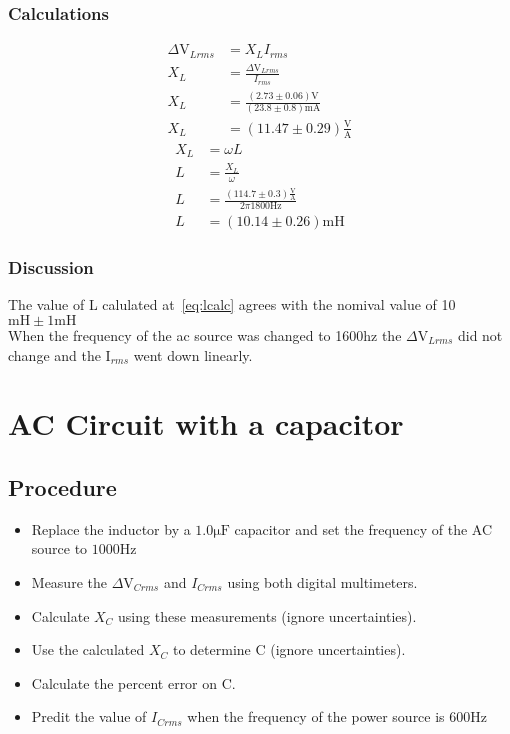 \documentclass{report}
\begin{document}
\subsection{Calculations}
\begin{align}
    \Delta\si{\volt}_{Lrms}&=X_{L}I_{rms}\nonumber\\
    X_{L}&=\frac{\Delta\si{\volt}_{Lrms}}{I_{rms}}\nonumber\\
    X_{L}&=\frac{(2.73\pm0.06)\si{\volt}}{(23.8\pm0.8)\si{\milli\ampere}}\nonumber\\
    X_{L}&=(11.47\pm 0.29)\frac{\si{\volt}}{\si{\ampere}} \label{eq:xlcalc}
\end{align}
\begin{align}
    X_{L}&=\omega L\nonumber\\
    L&=\frac{X_{L}}{\omega}\nonumber\\
    L&=\frac{(114.7\pm 0.3)\frac{\si{\volt}}{\si{\ampere}}}{2\pi1800\si{\hertz}} \nonumber\\
    L&=(10.14 \pm 0.26)\si{\milli}\si{\henry}\label{eq:lcalc}
\end{align}
\subsection{Discussion}
The value of L calulated at~\eqref{eq:lcalc} agrees with the nomival value of 10$\si{\milli}\si{\henry}\pm1\si{\milli}\si{\henry}$\\
When the frequency of the ac source was changed to 1600hz the $\Delta\si{\volt}_{Lrms}$ did not change and the I$_{rms}$ went down linearly.

\chapter{ AC Circuit with a capacitor}

\section{Procedure}

\begin{itemize}
    \item Replace the inductor by a $1.0\si{\micro\farad}$ capacitor and set the frequency of the AC source to $1000\si{\hertz}$
    \item Measure the $\Delta\si{\volt}_{Crms}$ and $I_{Crms}$ using both digital multimeters.
    \item Calculate $X_{C}$ using these measurements (ignore uncertainties).
    \item Use the calculated $X_{C}$ to determine C (ignore uncertainties).
    \item Calculate the percent error on C.
    \item Predit the value of $I_{Crms}$ when the frequency of the power source is $600\si{\hertz}$ 
\end{itemize}
\end{document}
